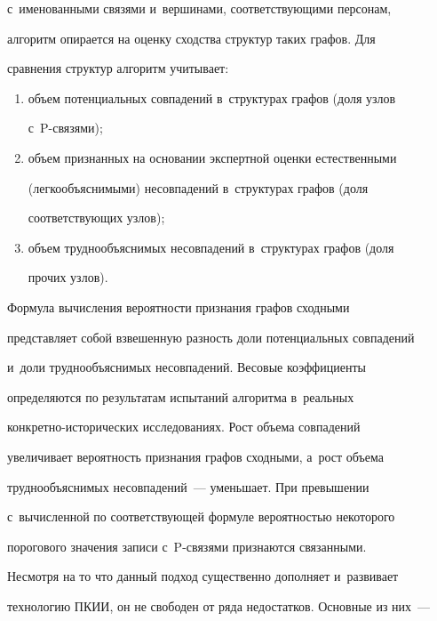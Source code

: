 с~именованными связями и~вершинами, соответствующими персонам, 


алгоритм опирается на оценку сходства структур таких графов. Для 


сравнения структур алгоритм учитывает:


  \begin{enumerate}[(1)]


  \item  объем потенциальных совпадений в~структурах графов (доля узлов 


с~P-свя\-зями);


  \item  объем признанных на основании экспертной оценки естественными 


(легкообъяснимыми) несовпадений в~структурах графов (доля 


соответствующих узлов);


  \item объем труднообъяснимых несовпадений в~структурах графов (доля 


прочих узлов).


  \end{enumerate}


  


  Формула вычисления вероятности признания графов сходными 


представляет собой взвешенную разность доли потенциальных совпадений 


и~доли труднообъяснимых несовпадений. Весовые коэффициенты 


определяются по результатам испытаний алгоритма в~реальных  


кон\-крет\-но-ис\-то\-ри\-че\-ских исследованиях. Рост объема совпадений 


увеличивает вероятность признания графов сходными, а~рост объема 


труднообъяснимых несовпадений~--- уменьшает. При превышении 


с~вычисленной по соответствующей формуле вероятностью некоторого 


порогового значения записи с~P-свя\-зя\-ми признаются связанными. 


  


  Несмотря на то что данный подход существенно дополняет и~развивает 


технологию ПКИИ, он не свободен от ряда недостатков. Основные из них~--- 


